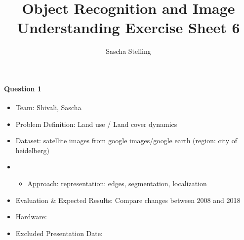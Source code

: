 \documentclass[10pt,a4]{article}
\author{Sascha Stelling}
\title{Object Recognition and Image Understanding Exercise Sheet 6}
\begin{document}
\maketitle

\paragraph{Question 1}
\begin{itemize}
	\item Team: Shivali, Sascha
	\item Problem Definition: Land use / Land cover dynamics
	\item Dataset: satellite images from google images/google earth (region: city of heidelberg)
	\item 
	\begin{itemize}
		\item Approach: representation: edges, segmentation, localization
	\end{itemize}
	\item Evaluation $\&$ Expected  Results: Compare changes between 2008 and 2018
	\item Hardware:
	\item Excluded Presentation Date:	
\end{itemize}
\end{document}
